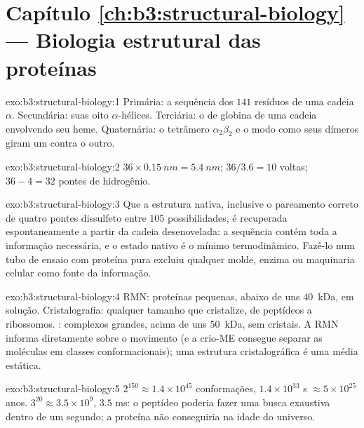 \section*{Capítulo \ref{ch:b3:structural-biology} --- Biologia estrutural das proteínas}

\begin{solution}{exo:b3:structural-biology:1}
Primária: a sequência dos $141$ resíduos de uma cadeia $\alpha$.
Secundária: suas oito $\alpha$-hélices. Terciária: o  de
globina de uma cadeia envolvendo seu heme. Quaternária: o tetrâmero
$\alpha_{2}\beta_{2}$ e o modo como seus dímeros giram um contra o
outro.
\end{solution}

\begin{solution}{exo:b3:structural-biology:2}
$36\times \qty{0.15}{nm} = \qty{5.4}{nm}$; $36/3.6 = 10$ voltas;
$36 - 4 = 32$ pontes de hidrogênio.
\end{solution}

\begin{solution}{exo:b3:structural-biology:3}
Que a estrutura nativa, inclusive o pareamento correto de quatro pontes
dissulfeto entre $105$ possibilidades, é recuperada espontaneamente a
partir da cadeia desenovelada: a sequência contém toda a informação
necessária, e o estado nativo é o mínimo termodinâmico. Fazê-lo num
tubo de ensaio com proteína pura excluiu qualquer molde, enzima ou
maquinaria celular como fonte da informação.
\end{solution}

\begin{solution}{exo:b3:structural-biology:4}
RMN: proteínas pequenas, abaixo de uns \qty{40}{kDa}, em solução.
Cristalografia: qualquer tamanho que cristalize, de peptídeos a
ribossomos. : complexos grandes, acima de uns
\qty{50}{kDa}, sem cristais. A RMN informa diretamente sobre o
movimento (e a crio-ME consegue separar as moléculas em classes
conformacionais); uma estrutura cristalográfica é uma média estática.
\end{solution}

\begin{solution}{exo:b3:structural-biology:5}
$2^{150} \approx 1.4\times 10^{45}$ conformações, $1.4\times 10^{33}$
s $\approx 5\times 10^{25}$ anos. $3^{20} \approx 3.5\times 10^{9}$,
$3.5$ ms: o peptídeo poderia fazer uma busca exaustiva dentro de um
segundo; a proteína não conseguiria na idade do universo.
\end{solution}

